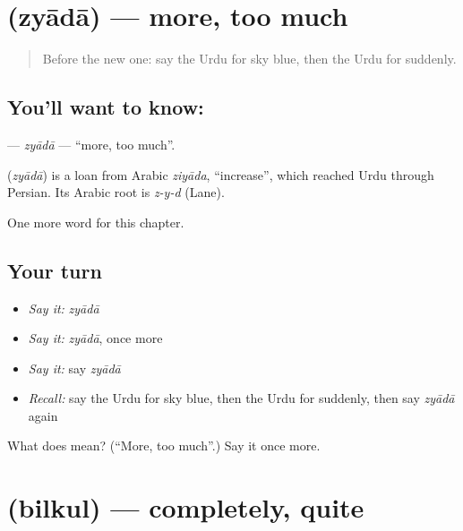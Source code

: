 \section[\texorpdfstring{\ur{زیادہ} (zyādā)}{زیادہ (zyādā)}]{ (zyādā) — more, too much}

\label{lesson:UR-C195-zyada}



\begin{quote}
Before the new one: say the Urdu for sky blue, then the Urdu for suddenly.
\end{quote}

\subsection*{You'll want to know: }
\textbf{} — \emph{zyādā} — \textquotedblleft{}more, too much\textquotedblright{}.

\begin{cousinweb}
\textbf{} (\emph{zyādā}) is a loan from Arabic \emph{ziyāda}, \textquotedblleft{}increase\textquotedblright{}, which reached Urdu through Persian. Its Arabic root is \emph{z-y-d} (Lane).
\end{cousinweb}

\begin{grammarlens}[title={What you've built}]
One more word for this chapter.
\end{grammarlens}

\subsection*{Your turn}
\begin{itemize}
\raggedright
  \item \emph{Say it:} \emph{zyādā}
  \item \emph{Say it:} \emph{zyādā}, once more
  \item \emph{Say it:} say \emph{zyādā}
  \item \emph{Recall:} say the Urdu for sky blue, then the Urdu for suddenly, then say \emph{zyādā} again
\end{itemize}

\begin{tcolorbox}[breakable,colback=teal!4,colframe=teal!35!black,title={Before you move on}]
What does  mean? (\textquotedblleft{}More, too much\textquotedblright{}.) Say it once more.
\end{tcolorbox}
\section[\texorpdfstring{\ur{بالکل} (bilkul)}{بالکل (bilkul)}]{ (bilkul) — completely, quite}


